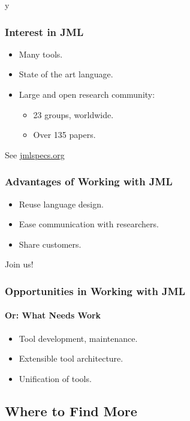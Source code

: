 \if y\MAKEHANDOUTS \documentclass[t,compress,landscape,handout]{beamer}
\begin{document}
\begin{frame}
\frametitle{Interest in JML}

\begin{itemize}
\item
Many tools.

\item
State of the art language.

\item
Large and open research community:
\begin{itemize}
\item
23 groups, worldwide.

\item
Over 135 papers.
\end{itemize}
\end{itemize}

See \href{http://www.jmlspecs.org}{jmlspecs.org}
\end{frame}

\begin{frame}[label=advantages]
\frametitle{Advantages of Working with JML}

\begin{itemize}
\item
Reuse language design.

\item
Ease communication with researchers.

\item
Share customers.
\end{itemize}

Join us!
\end{frame}

\begin{frame}[label=opportunities]
\frametitle{Opportunities in Working with JML}
\framesubtitle{Or: What Needs Work}

\begin{itemize}
\item
Tool development, maintenance.

\item
Extensible tool architecture.

\item
Unification of tools.
\end{itemize}
\end{frame}

\subsection[Finding More]{Where to Find More}
\end{document}
